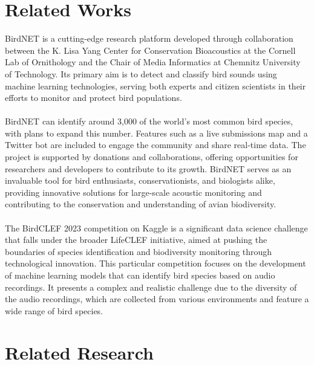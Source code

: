 \section{Related Works}
BirdNET is a cutting-edge research platform developed through collaboration
between the K. Lisa Yang Center for Conservation Bioacoustics at the Cornell
Lab of Ornithology and the Chair of Media Informatics at Chemnitz University of
Technology. Its primary aim is to detect and classify bird sounds using machine
learning technologies, serving both experts and citizen scientists in their
efforts to monitor and protect bird populations.\\\\ BirdNET can identify
around 3,000 of the world's most common bird species, with plans to expand this
number. Features such as a live submissions map and a Twitter bot are included
to engage the community and share real-time data. The project is supported by
donations and collaborations, offering opportunities for researchers and
developers to contribute to its growth. BirdNET serves as an invaluable tool
for bird enthusiasts, conservationists, and biologists alike, providing
innovative solutions for large-scale acoustic monitoring and contributing to
the conservation and understanding of avian biodiversity.\\\\ The BirdCLEF 2023
competition on Kaggle is a significant data science challenge that falls under
the broader LifeCLEF initiative, aimed at pushing the boundaries of species
identification and biodiversity monitoring through technological innovation.
This particular competition focuses on the development of machine learning
models that can identify bird species based on audio recordings. It presents a
complex and realistic challenge due to the diversity of the audio recordings,
which are collected from various environments and feature a wide range of bird
species.
\section{Related Research}

